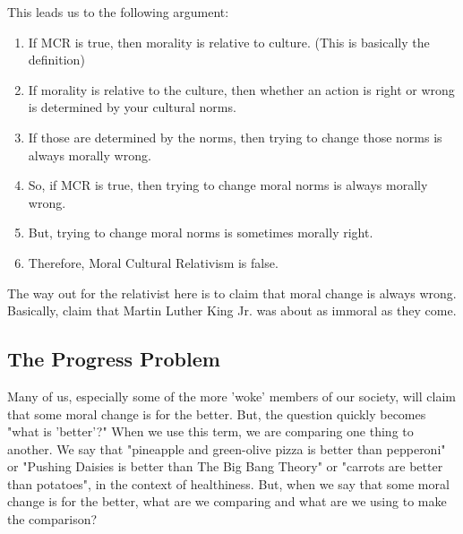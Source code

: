This leads us to the following argument:
\begin{enumerate}
    \item If MCR is true, then morality is relative to culture. (This is basically the definition)
    \item If morality is relative to the culture, then whether an action is right or wrong is determined by your cultural norms.
    \item If those are determined by the norms, then trying to change those norms is always morally wrong.
    \item So, if MCR is true, then trying to change moral norms is always morally wrong.
    \item But, trying to change moral norms is sometimes morally right.
    \item Therefore, Moral Cultural Relativism is false.
\end{enumerate}
The way out for the relativist here is to claim that moral change is always wrong. Basically, claim that Martin Luther King Jr. was about as immoral as they come.

\subsection{The Progress Problem}

Many of us, especially some of the more 'woke' members of our society, will claim that some moral change is for the better. But, the question quickly becomes "what is 'better'?" When we use this term, we are comparing one thing to another. We say that "pineapple and green-olive pizza is better than pepperoni" or "Pushing Daisies is better than The Big Bang Theory" or "carrots are better than potatoes", in the context of healthiness. But, when we say that some moral change is for the better, what are we comparing and what are we using to make the comparison?

